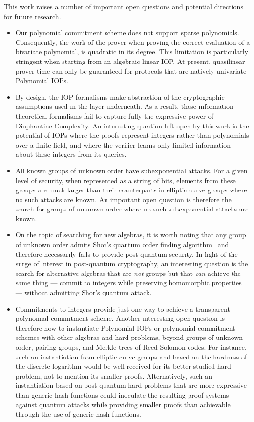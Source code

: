 This work raises a number of important open questions and potential directions for future research.
\begin{itemize}
 \item Our polynomial commitment scheme does not support sparse polynomials. Consequently, the work of the prover when proving the correct evaluation of a bivariate polynomial, is quadratic in its degree. This limitation is particularly stringent when starting from an algebraic linear IOP. At present, quasilinear prover time can only be guaranteed for protocols that are natively univariate Polynomial IOPs. 

 \item By design, the IOP formalisms make abstraction of the cryptographic assumptions used in the layer underneath. As a result, these information theoretical formalisms fail to capture fully the expressive power of Diophantine Complexity. An interesting question left open by this work is the potential of IOPs where the proofs represent integers rather than polynomials over a finite field, and where the verifier learns only limited information about these integers from its queries.
 
 \item All known groups of unknown order have subexponential attacks. For a given level of security, when represented as a string of bits, elements from these groups are much larger than their counterparts in elliptic curve groups where no such attacks are known. An important open question is therefore the search for groups of unknown order where no such subexponential attacks are known. 
 
 \item On the topic of searching for new algebras, it is worth noting that any group of unknown order admits Shor's quantum order finding algorithm~\cite{conf/focs/Shor94} and therefore necessarily fails to provide post-quantum security. In light of the surge of interest in post-quantum cryptography, an interesting question is the search for alternative algebras that are \emph{not} groups but that \emph{can} achieve the same thing --- commit to integers while preserving homomorphic properties --- without admitting Shor's quantum attack. 

 \item Commitments to integers provide just one way to achieve a transparent polynomial commitment scheme. Another interesting open question is therefore how to instantiate Polynomial IOPs or polynomial commitment schemes with other algebras and hard problems, beyond groups of unknown order, pairing groups, and Merkle trees of Reed-Solomon codes. For instance, such an instantiation from elliptic curve groups and based on the hardness of the discrete logarithm would be well received for its better-studied hard problem, not to mention its smaller proofs. Alternatively, such an instantiation based on post-quantum hard problems that are more expressive than generic hash functions could inoculate the resulting proof systems against quantum attacks while providing smaller proofs than achievable through the use of generic hash functions.
\end{itemize}

